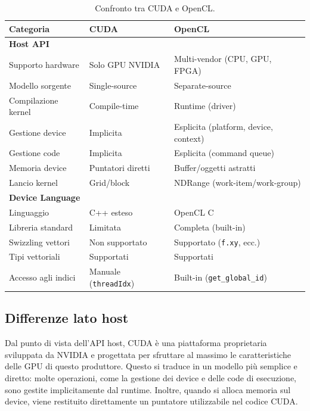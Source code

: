 \begin{table}[htbp]
\centering
\small
\begin{tabular}{lll}
\toprule
\textbf{Categoria} & \textbf{CUDA} & \textbf{OpenCL} \\
\midrule

\multicolumn{3}{l}{\textbf{Host API}} \\
\midrule
Supporto hardware & Solo GPU NVIDIA & Multi-vendor (CPU, GPU, FPGA) \\
Modello sorgente & Single-source & Separate-source \\
Compilazione kernel & Compile-time & Runtime (driver) \\
Gestione device & Implicita & Esplicita (platform, device, context) \\
Gestione code & Implicita & Esplicita (command queue) \\
Memoria device & Puntatori diretti & Buffer/oggetti astratti \\
Lancio kernel & Grid/block & NDRange (work-item/work-group) \\

\midrule
\multicolumn{3}{l}{\textbf{Device Language}} \\
\midrule
Linguaggio & C++ esteso & OpenCL C \\
Libreria standard & Limitata & Completa (built-in) \\
Swizzling vettori & Non supportato & Supportato (\texttt{f.xy}, ecc.) \\
Tipi vettoriali & Supportati & Supportati \\
Accesso agli indici & Manuale (\texttt{threadIdx}) & Built-in (\texttt{get\_global\_id}) \\

\bottomrule
\end{tabular}
\caption{Confronto tra CUDA e OpenCL.}
\label{tab:cuda_opencl}
\end{table}

\subsection{Differenze lato host}

Dal punto di vista dell’API host, CUDA è una piattaforma proprietaria sviluppata da NVIDIA e progettata per sfruttare al massimo le caratteristiche delle GPU di questo produttore. Questo si traduce in un modello più semplice e diretto: molte operazioni, come la gestione dei device e delle code di esecuzione, sono gestite implicitamente dal runtime. Inoltre, quando si alloca memoria sul device, viene restituito direttamente un puntatore utilizzabile nel codice CUDA.

